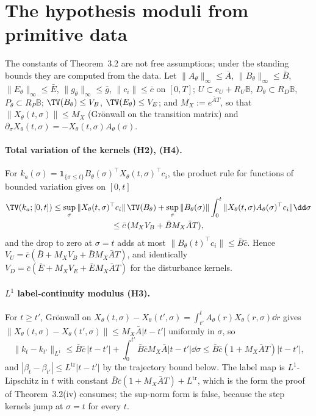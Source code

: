 \section{The hypothesis moduli from primitive data}\label{S:moduli}

The constants of Theorem~3.2 are not free assumptions; under the standing bounds they are computed from the data. Let $\|A_\theta\|_\infty\le\bar A$, $\|B_\theta\|_\infty\le\bar B$, $\|E_\theta\|_\infty\le\bar E$, $\|g_\theta\|_\infty\le\bar g$, $\|c_i\|\le\bar c$ on $[0,T]$; $U\subset c_U+R_U\mathbb B$, $D_\theta\subset R_D\mathbb B$, $P_\theta\subset R_P\mathbb B$; $\TV(B_\theta)\le V_B$, $\TV(E_\theta)\le V_E$; and $M_X:=e^{\bar AT}$, so that $\|X_\theta(t,\sigma)\|\le M_X$ (Gr\"onwall on the transition matrix) and $\partial_\sigma X_\theta(t,\sigma)=-X_\theta(t,\sigma)A_\theta(\sigma)$.

\paragraph{Total variation of the kernels (H2), (H4).}
For $k_a(\sigma)=\mathbf 1_{\{\sigma\le t\}}B_\theta(\sigma)^\top X_\theta(t,\sigma)^\top c_i$, the product rule for functions of bounded variation gives on $[0,t]$
\begin{multline*}
\TV(k_a;[0,t])\le\sup_\sigma\|X_\theta(t,\sigma)^\top c_i\|\,\TV(B_\theta)+\sup_\sigma\|B_\theta(\sigma)\|\int_0^t\|X_\theta(t,\sigma)A_\theta(\sigma)^\top c_i\|\dd\sigma\\
\le\bar c\,(M_XV_B+\bar BM_X\bar AT),
\end{multline*}
and the drop to zero at $\sigma=t$ adds at most $\|B_\theta(t)^\top c_i\|\le\bar B\bar c$. Hence $V_U=\bar c(\bar B+M_XV_B+\bar BM_X\bar AT)$, and identically $V_D=\bar c(\bar E+M_XV_E+\bar EM_X\bar AT)$ for the disturbance kernels.

\paragraph{$L^1$ label-continuity modulus (H3).}
For $t\ge t'$, Gr\"onwall on $X_\theta(t,\sigma)-X_\theta(t',\sigma)=\int_{t'}^tA_\theta(r)X_\theta(r,\sigma)\dd r$ gives $\|X_\theta(t,\sigma)-X_\theta(t',\sigma)\|\le M_X\bar A|t-t'|$ uniformly in $\sigma$, so
\[
\|k_t-k_{t'}\|_{L^1}\le\bar B\bar c\,|t-t'|+\int_0^{t'}\bar B\bar cM_X\bar A|t-t'|\dd\sigma\le\bar B\bar c(1+M_X\bar AT)|t-t'| ,
\]
and $|\beta_t-\beta_{t'}|\le L^{\mathrm{tr}}|t-t'|$ by the trajectory bound below. The label map is $L^1$-Lipschitz in $t$ with constant $\bar B\bar c(1+M_X\bar AT)+L^{\mathrm{tr}}$, which is the form the proof of Theorem~3.2(iv) consumes; the sup-norm form is false, because the step kernels jump at $\sigma=t$ for every $t$.

